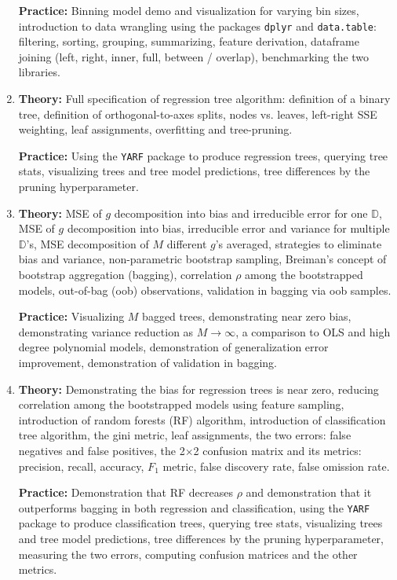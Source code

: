\begin{enumerate}[(1)]
\textbf{Practice:} Binning model demo and visualization for varying bin sizes, introduction to data wrangling using the packages \texttt{dplyr} and \texttt{data.table}: filtering, sorting, grouping, summarizing, feature derivation, dataframe joining (left, right, inner, full, between / overlap), benchmarking the two libraries.

\item \textbf{Theory:} Full specification of regression tree algorithm: definition of a binary tree, definition of orthogonal-to-axes splits, nodes vs. leaves, left-right SSE weighting, leaf assignments, overfitting and tree-pruning.

\textbf{Practice:} Using the \texttt{YARF} package to produce regression trees, querying tree stats, visualizing trees and tree model predictions, tree differences by the pruning hyperparameter.

\item \textbf{Theory:} MSE of $g$ decomposition into bias and irreducible error for one $\mathbb{D}$, MSE of $g$ decomposition into bias, irreducible error and variance for multiple $\mathbb{D}$'s, MSE decomposition of $M$ different $g$'s averaged, strategies to eliminate bias and variance, non-parametric bootstrap sampling, Breiman's concept of bootstrap aggregation (bagging), correlation $\rho$ among the bootstrapped models, out-of-bag (oob) observations, validation in bagging via oob samples.

\textbf{Practice:} Visualizing $M$ bagged trees, demonstrating near zero bias, demonstrating variance reduction as $M \rightarrow \infty$, a comparison to OLS and high degree polynomial models, demonstration of generalization error improvement, demonstration of validation in bagging.

\item \textbf{Theory:} Demonstrating the bias for regression trees is near zero, reducing correlation among the bootstrapped models using feature sampling, introduction of random forests (RF) algorithm, introduction of classification tree algorithm, the gini metric, leaf assignments, the two errors: false negatives and false positives, the 2$\times$2 confusion matrix and its metrics: precision, recall, accuracy, $F_1$ metric, false discovery rate, false omission rate.

\textbf{Practice:} Demonstration that RF decreases $\rho$ and demonstration that it outperforms bagging in both regression and classification, using the \texttt{YARF} package to produce classification trees, querying tree stats, visualizing trees and tree model predictions, tree differences by the pruning hyperparameter, measuring the two errors, computing confusion matrices and the other metrics.


\end{enumerate}
